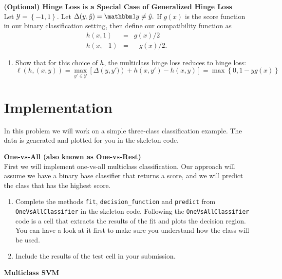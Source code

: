 \documentclass{article}
\newcommand{\nyuparagraph}[1]{\vspace{0.3cm}\textcolor{nyupurple}{\bf \large #1}\\}
\theoremstyle{plain}
\theoremstyle{definition}
\begin{document}
\nyuparagraph{(Optional) Hinge Loss is a Special Case of Generalized Hinge
Loss}

Let $\mathcal{Y}=\left\{ -1,1\right\} $. Let $\Delta(y,\hat{y})=\ind{y\neq\hat{y}}.$
If $g(x)$ is the score function in our binary classification setting,
then define our compatibility function as 
\begin{eqnarray*}
h(x,1) & = & g(x)/2\\
h(x,-1) & = & -g(x)/2.
\end{eqnarray*}
\begin{enumerate}
\setcounter{enumi}{\value{saveenum}}
\item Show that for this choice of $h$, the multiclass hinge loss reduces
to hinge loss: 
\[
\ell\left(h,\left(x,y\right)\right)=\max_{y'\in\mathcal{Y}}\left[\Delta\left(y,y')\right)+h(x,y')-h(x,y)\right]=\max\left\{ 0,1-yg(x)\right\} 
\]
\setcounter{saveenum}{\value{enumi}}
\end{enumerate}


\section{Implementation}

In this problem we will work on a simple three-class classification
example.
The data is generated and plotted for you in the skeleton code. 

\nyuparagraph{One-vs-All (also known as One-vs-Rest)}

First we will implement one-vs-all multiclass classification.
Our approach will assume we have a binary base classifier that returns
a score, and we will predict the class that has the highest score. 
\begin{enumerate}
  \setcounter{enumi}{\value{saveenum}}
\item Complete the methods \texttt{fit}, \texttt{decision\_function} and \texttt{predict} from \texttt{OneVsAllClassifier}  in the skeleton code. Following
the \texttt{OneVsAllClassifier} code is a cell that extracts the results of
the fit and plots the decision region. You can have a look at it first to make sure you understand how the class will be used.
\item  Include the results of the test cell in your submission.
\setcounter{saveenum}{\value{enumi}}
\end{enumerate}


\nyuparagraph{Multiclass SVM}
\end{document}
